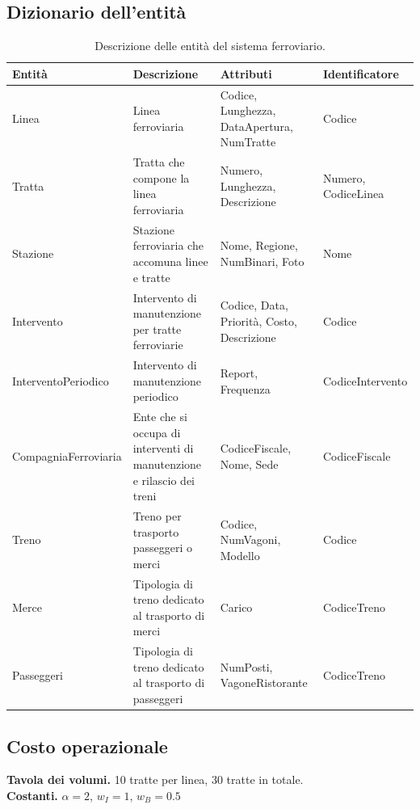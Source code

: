\documentclass{article}
\begin{document}
\subsection*{Dizionario dell'entità}

\begin{table}[ht]
    \centering
    \begin{tabularx}{\textwidth}{|X|X|X|X|}
        \hline
        Entità & Descrizione & Attributi & Identificatore \\
        \hline
        Linea & Linea ferroviaria & Codice, Lunghezza, DataApertura, NumTratte & Codice \\        
        \hline
        Tratta & Tratta che compone la linea ferroviaria & Numero, Lunghezza, Descrizione & Numero, CodiceLinea \\
        \hline
        Stazione & Stazione ferroviaria che accomuna linee e tratte & Nome, Regione, NumBinari, Foto & Nome \\
        \hline
        Intervento & Intervento di manutenzione per tratte ferroviarie & Codice, Data, Priorità, Costo, Descrizione & Codice \\
        \hline
        InterventoPeriodico & Intervento di manutenzione periodico & Report, Frequenza & CodiceIntervento \\
        \hline
        CompagniaFerroviaria & Ente che si occupa di interventi di manutenzione e rilascio dei treni & CodiceFiscale, Nome, Sede & CodiceFiscale \\
        \hline
        Treno & Treno per trasporto passeggeri o merci & Codice, NumVagoni, Modello & Codice \\
        \hline
        Merce & Tipologia di treno dedicato al trasporto di merci & Carico & CodiceTreno \\
        \hline
        Passeggeri & Tipologia di treno dedicato al trasporto di passeggeri & NumPosti, VagoneRistorante & CodiceTreno \\
        \hline
    \end{tabularx}
    \caption{Descrizione delle entità del sistema ferroviario.}
    \label{tab:descrizione-entita}
\end{table}

\subsection*{Costo operazionale}

\textbf{Tavola dei volumi.} 10 tratte per linea, 30 tratte in totale.\\
\textbf{Costanti.} $\alpha = 2$, $w_I = 1$, $w_B = 0.5$
\end{document}
